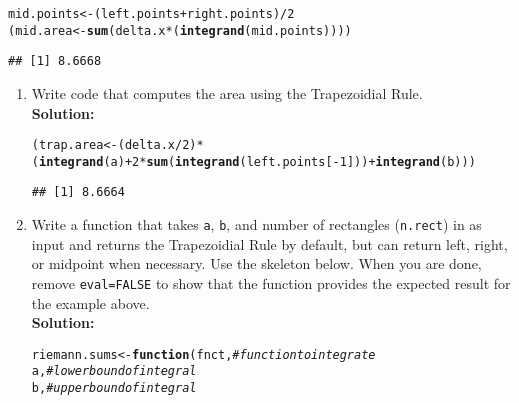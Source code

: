 \documentclass{article}\usepackage[]{graphicx}\usepackage[]{xcolor}
\makeatletter
\newcommand{\hlnum}[1]{\textcolor[rgb]{0.686,0.059,0.569}{#1}}%
\newcommand{\hlcom}[1]{\textcolor[rgb]{0.678,0.584,0.686}{\textit{#1}}}%
\newcommand{\hlopt}[1]{\textcolor[rgb]{0,0,0}{#1}}%
\newcommand{\hldef}[1]{\textcolor[rgb]{0.345,0.345,0.345}{#1}}%
\newcommand{\hlkwa}[1]{\textcolor[rgb]{0.161,0.373,0.58}{\textbf{#1}}}%
\newcommand{\hlkwb}[1]{\textcolor[rgb]{0.69,0.353,0.396}{#1}}%
\newcommand{\hlkwc}[1]{\textcolor[rgb]{0.333,0.667,0.333}{#1}}%
\newcommand{\hlkwd}[1]{\textcolor[rgb]{0.737,0.353,0.396}{\textbf{#1}}}%
\newenvironment{kframe}{%
 \def\at@end@of@kframe{}%
 \ifinner\ifhmode%
  \def\at@end@of@kframe{\end{minipage}}%
  \begin{minipage}{\columnwidth}%
 \fi\fi%
 \def\FrameCommand##1{\hskip\@totalleftmargin \hskip-\fboxsep
 \colorbox{shadecolor}{##1}\hskip-\fboxsep
     \hskip-\linewidth \hskip-\@totalleftmargin \hskip\columnwidth}%
 \MakeFramed {\advance\hsize-\width
   \@totalleftmargin\z@ \linewidth\hsize
   \@setminipage}}%
 {\par\unskip\endMakeFramed%
 \at@end@of@kframe}
\newenvironment{knitrout}{}{} %
\makeatother
\begin{document}
\begin{enumerate}
\begin{knitrout}
\begin{kframe}
\begin{alltt}
\hldef{mid.points} \hlkwb{<-} \hldef{(left.points}\hlopt{+}\hldef{right.points)}\hlopt{/}\hlnum{2}
\hldef{(mid.area} \hlkwb{<-} \hlkwd{sum}\hldef{(delta.x}\hlopt{*}\hldef{(}\hlkwd{integrand}\hldef{(mid.points))))}
\end{alltt}
\begin{verbatim}
## [1] 8.6668
\end{verbatim}
\end{kframe}
\end{knitrout}
\newpage
\begin{enumerate}
  \item Write code that computes the area using the Trapezoidial Rule.\\
  \textbf{Solution:}
\begin{knitrout}\scriptsize
{}\color{fgcolor}\begin{kframe}
\begin{alltt}
\hldef{(trap.area} \hlkwb{<-} \hldef{(delta.x} \hlopt{/} \hlnum{2}\hldef{)} \hlopt{*} \hldef{(}\hlkwd{integrand}\hldef{(a)} \hlopt{+} \hlnum{2} \hlopt{*} \hlkwd{sum}\hldef{(}\hlkwd{integrand}\hldef{(left.points[}\hlopt{-}\hlnum{1}\hldef{]))} \hlopt{+} \hlkwd{integrand}\hldef{(b)))}
\end{alltt}
\begin{verbatim}
## [1] 8.6664
\end{verbatim}
\end{kframe}
\end{knitrout}
  \item Write a function that takes \texttt{a}, \texttt{b}, and number of 
  rectangles (\texttt{n.rect}) in as input and returns the Trapezoidial Rule 
  by default, but can return left, right, or midpoint when necessary. Use the
  skeleton below. When you are done, remove \texttt{eval=FALSE} to show that
  the function provides the expected result for the example above.\\
  \textbf{Solution:}
\begin{knitrout}\scriptsize
{}\color{fgcolor}\begin{kframe}
\begin{alltt}
\hldef{riemann.sums} \hlkwb{<-} \hlkwa{function}\hldef{(}\hlkwc{fnct}\hldef{,}                        \hlcom{# function to integrate}
                         \hlkwc{a}\hldef{,}                           \hlcom{# lower bound of integral}
                         \hlkwc{b}\hldef{,}                           \hlcom{# upper bound of integral}

\end{alltt}
\end{kframe}
\end{knitrout}
\end{enumerate}
\end{enumerate}
\end{document}

